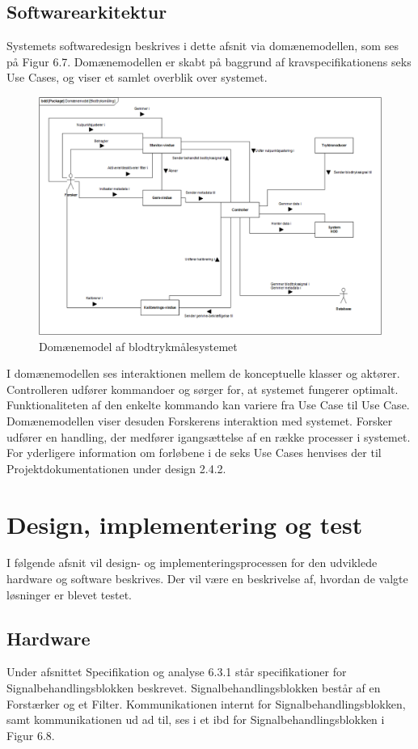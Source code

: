  
\subsection{Softwarearkitektur}
Systemets softwaredesign beskrives i dette afsnit via domænemodellen, som ses på Figur 6.7. Domænemodellen er skabt på baggrund af kravspecifikationens seks Use Cases, og viser et samlet overblik over systemet. 
\begin{figure}[H]
	\centering
	\includegraphics[width=1\textwidth]{Figurer/dm}
	\caption{Domænemodel af blodtrykmålesystemet}
\end{figure}
I domænemodellen ses interaktionen mellem de konceptuelle klasser og aktører. Controlleren udfører kommandoer og sørger for, at systemet fungerer optimalt. Funktionaliteten af den enkelte kommando kan variere fra Use Case til Use Case. Domænemodellen viser desuden Forskerens interaktion med systemet. Forsker udfører en handling, der medfører igangsættelse af en række processer i systemet. 
For yderligere information om forløbene i de seks Use Cases henvises der til Projektdokumentationen under design 2.4.2. 


\section{Design, implementering og test}
I følgende afsnit vil design- og implementeringsprocessen for den udviklede hardware og software beskrives. Der vil være en beskrivelse af, hvordan de valgte løsninger er blevet testet. 

\subsection{Hardware}
Under afsnittet Specifikation og analyse 6.3.1 står specifikationer for Signalbehandlingsblokken beskrevet. Signalbehandlingsblokken består af en Forstærker og et Filter. Kommunikationen internt for Signalbehandlingsblokken, samt kommunikationen ud ad til, ses i et ibd for Signalbehandlingsblokken i Figur 6.8.  

